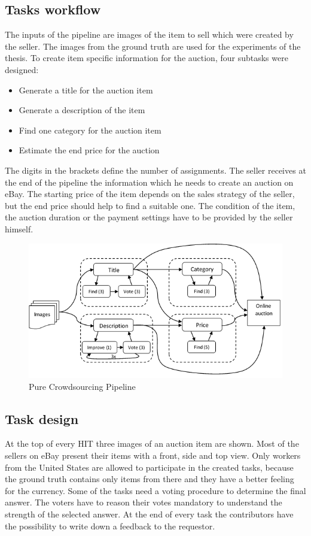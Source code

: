 \subsection{Tasks workflow}
The inputs of the pipeline are images of the item to sell which were created by the seller. The images from the ground truth are used for the experiments of the thesis. To create item specific information for the auction, four subtasks were designed: 
\begin{itemize}
	\item Generate a title for the auction item
	\item Generate a description of the item
	\item Find one category for the auction item  
	\item Estimate the end price for the auction  
\end{itemize}
The digits in the brackets define the number of assignments. The seller receives at the end of the pipeline the information which he needs to create an auction on eBay. The starting price of the item depends on the sales strategy of the seller, but the end price should help to find a suitable one. The condition of the item, the auction duration or the payment settings have to be provided by the seller himself.
\begin{figure}[h!]
\centering
\includegraphics[scale=0.8]{images/pipelines/Pure_Pipeline.png}
\caption{Pure Crowdsourcing Pipeline}
\label{purePipeline}
\end{figure}

\subsection{Task design}
At the top of every HIT three images of an auction item are shown. Most of the sellers on eBay present their items with a front, side and top view. Only workers from the United States are allowed to participate in the created tasks, because the ground truth contains only items from there and they have a better feeling for the currency. Some of the tasks need a voting procedure to determine the final answer. The voters have to reason their votes mandatory to understand the strength of the selected answer. At the end of every task the contributors have the possibility to write down a feedback to the requestor.
